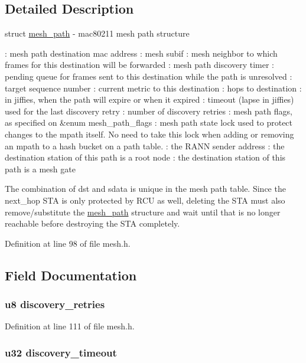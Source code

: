 \subsection{Detailed Description}
struct \hyperlink{structmesh__path}{mesh\-\_\-path} -\/ mac80211 mesh path structure

\-: mesh path destination mac address \-: mesh subif \-: mesh neighbor to which frames for this destination will be forwarded \-: mesh path discovery timer \-: pending queue for frames sent to this destination while the path is unresolved \-: target sequence number \-: current metric to this destination \-: hops to destination \-: in jiffies, when the path will expire or when it expired \-: timeout (lapse in jiffies) used for the last discovery retry \-: number of discovery retries \-: mesh path flags, as specified on \&enum mesh\-\_\-path\-\_\-flags \-: mesh path state lock used to protect changes to the mpath itself. No need to take this lock when adding or removing an mpath to a hash bucket on a path table. \-: the R\-A\-N\-N sender address \-: the destination station of this path is a root node \-: the destination station of this path is a mesh gate

The combination of dst and sdata is unique in the mesh path table. Since the next\-\_\-hop S\-T\-A is only protected by R\-C\-U as well, deleting the S\-T\-A must also remove/substitute the \hyperlink{structmesh__path}{mesh\-\_\-path} structure and wait until that is no longer reachable before destroying the S\-T\-A completely. 

Definition at line 98 of file mesh.\-h.



\subsection{Field Documentation}
\hypertarget{structmesh__path_a7ce70c7ff6bf0aef3fec882ad4959555}{
\subsubsection[{discovery\-\_\-retries}]{\setlength{\rightskip}{0pt plus 5cm}u8 discovery\-\_\-retries}}\label{structmesh__path_a7ce70c7ff6bf0aef3fec882ad4959555}


Definition at line 111 of file mesh.\-h.

\hypertarget{structmesh__path_a7875d6c0fb79d3ecfa1bedcdbc7e9704}{
\subsubsection[{discovery\-\_\-timeout}]{\setlength{\rightskip}{0pt plus 5cm}u32 discovery\-\_\-timeout}}\label{structmesh__path_a7875d6c0fb79d3ecfa1bedcdbc7e9704}


